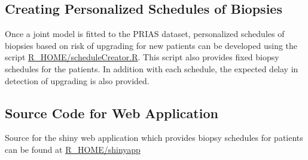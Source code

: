 \subsection{Creating Personalized Schedules of Biopsies}
Once a joint model is fitted to the PRIAS dataset, personalized schedules of biopsies based on risk of upgrading for new patients can be developed using the script \url{R_HOME/scheduleCreator.R}. This script also provides fixed biopsy schedules for the patients. In addition with each schedule, the expected delay in detection of upgrading is also provided.

\subsection{Source Code for Web Application}
Source for the shiny web application which provides biopsy schedules for patients can be found at \url{R_HOME/shinyapp}
